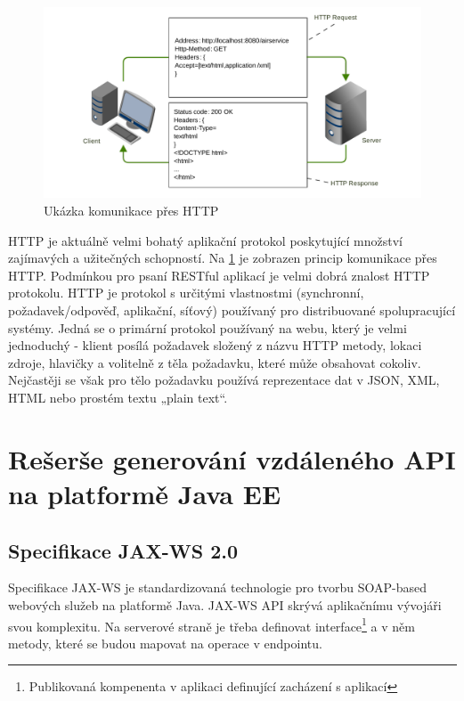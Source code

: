 \documentclass[11pt,twoside,a4paper]{book}
\begin{document}
\begin{figure}[h]
\begin{center}
\includegraphics[width=13cm]{images-pdf/http.pdf}
\caption{Ukázka komunikace přes HTTP}
\label{fig:http-komunikace}
\end{center}
\end{figure}

HTTP je aktuálně velmi bohatý aplikační protokol poskytující množství zajímavých a
užitečných schopností. Na \ref{fig:http-komunikace} je zobrazen princip
komunikace přes HTTP. Podmínkou pro psaní RESTful aplikací je velmi dobrá
znalost HTTP protokolu.
HTTP je protokol s určitými vlastnostmi (synchronní, požadavek/odpověď, aplikační, síťový) používaný pro distribuované spolupracující systémy. Jedná se o primární
protokol používaný na webu, který je velmi jednoduchý - klient posílá požadavek složený z
názvu HTTP metody, lokaci zdroje, hlavičky a volitelně z těla požadavku, které může
obsahovat cokoliv. Nejčastěji se však pro tělo požadavku používá reprezentace dat v JSON,
XML, HTML nebo prostém textu „plain text“.

\section{Rešerše generování vzdáleného API na platformě Java EE}

\subsection{Specifikace JAX-WS 2.0} 
\label{subsec:specifikace-jax-ws}

Specifikace JAX-WS \cite{JAXWS20} je standardizovaná technologie pro tvorbu SOAP-based
webových služeb na platformě Java. JAX-WS API skrývá aplikačnímu vývojáři svou
komplexitu.
Na serverové straně je třeba definovat interface\footnote{Publikovaná kompenenta
v aplikaci definující zacházení s aplikací} a v něm metody, které se budou
mapovat na operace v endpointu.
\end{document}
